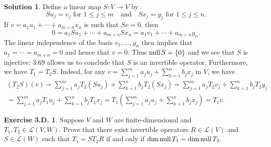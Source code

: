 \documentclass[12pt]{article}
\theoremstyle{definition}
\theoremstyle{exercise}
\newtheorem{exercise}{Exercise 3.D.}
\theoremstyle{solution}
\newtheorem*{solution}{Solution}
\newcommand{\lmap}{\mathcal{L}}
\newcommand{\Null}{\text{null\,}}
\newcommand{\quand}{\quad \text{and} \quad}
\begin{document}
\begin{solution}
    Define a linear map \( S : V \to V \) by
    \[
        Su_j = v_j \text{ for } 1 \leq j \leq m \quand Sx_j = y_j \text{ for } 1 \leq j \leq n.
    \]
    If \( v = a_1 u_1 + \cdots + a_{m+n} x_n \) is such that \( Sv = 0 \), then
    \[
        0 = a_1 Su_1 + \cdots + a_{m+n} Sx_n = a_1 v_1 + \cdots + a_{m+n} y_n.
    \]
    The linear independence of the basis \( v_1, \ldots, y_n \) then implies that \( a_1 = \cdots = a_{m+n} = 0 \) and hence that \( v = 0 \). Thus \( \Null S = \{ 0 \} \) and we see that \( S \) is injective; 3.69 allows us to conclude that \( S \) is an invertible operator. Furthermore, we have \( T_1 = T_2 S \). Indeed, for any \( v = \sum_{j=1}^m a_j u_j + \sum_{k=1}^n b_j x_j \) in \( V \), we have
    \begin{multline*}
        (T_2S)(v) = \sum_{j=1}^m a_j T_2(Su_j) + \sum_{k=1}^n b_j T_2(Sx_j) = \sum_{j=1}^m a_j T_2v_j + \sum_{k=1}^n b_j T_2y_j \\ = \sum_{j=1}^m a_j T_1u_j + \sum_{k=1}^n b_j T_1x_j = T_1 \left( \sum_{j=1}^m a_j u_j + \sum_{k=1}^n b_j x_j \right) = T_1v.
    \end{multline*}
\end{solution}

\begin{exercise}
\label{ex:6}
    Suppose \( V \) and \( W \) are finite-dimensional and \( T_1, T_2 \in \lmap(V, W) \). Prove that there exist invertible operators \( R \in \lmap(V) \) and \( S \in \lmap(W) \) such that \( T_1 = ST_2R \) if and only if \( \dim \Null T_1 = \dim \Null T_2 \).
\end{exercise}
\end{document}
